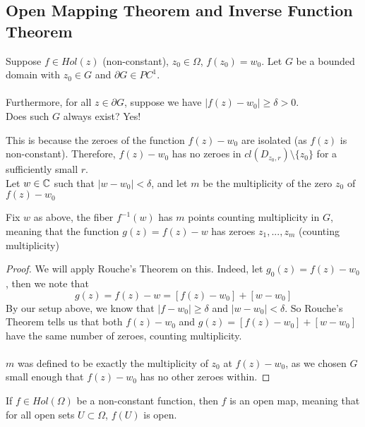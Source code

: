 \subsection{Open Mapping Theorem and Inverse Function Theorem}

Suppose $f \in Hol(z)$ (non-constant), $z_0 \in \Omega$, $f(z_0) = w_0$. Let $G$ be a bounded domain with $z_0 \in G$ and $\partial G \in PC^1$.\\\\
Furthermore, for all $z \in \partial G$, suppose we have $|f(z) - w_0| \geq \delta > 0$.\\

Does such $G$ always exist? Yes!

This is because the zeroes of the function $f(z) - w_0$ are isolated (as $f(z)$ is non-constant). Therefore, $f(z) - w_0$ has no zeroes in $cl(D_{z_0, r}) \setminus \{z_0\}$ for a sufficiently small $r$.\\

Let $w \in \mathbb{C}$ such that $|w - w_0| < \delta$, and let $m$ be the multiplicity of the zero $z_0$ of $f(z) - w_0$

\begin{lemma}
Fix $w$ as above, the fiber $f^{-1}(w)$ has $m$ points counting multiplicity in $G$, meaning that the function $g(z) = f(z) - w$ has zeroes $z_1, ..., z_m$ (counting multiplicity)
\end{lemma}

\begin{proof}
We will apply Rouche's Theorem on this. Indeed, let $g_0(z) = f(z) - w_0$, then we note that
\[g(z) = f(z) - w = [f(z) - w_0] + [w - w_0]\]
By our setup above, we know that $|f - w_0| \geq \delta$ and $|w - w_0| < \delta$. So Rouche's Theorem tells us that both $f(z) - w_0$ and $g(z) = [f(z) - w_0] + [w - w_0]$ have the same number of zeroes, counting multiplicity.\\\\
$m$ was defined to be exactly the multiplicity of $z_0$ at $f(z) - w_0$, as we chosen $G$ small enough that $f(z) - w_0$ has no other zeroes within. 
\end{proof}

\begin{corollary}
If $f \in Hol(\Omega)$ be a non-constant function, then $f$ is an open map, meaning that for all open sets $U \subset \Omega$, $f(U)$ is open.
\end{corollary}

